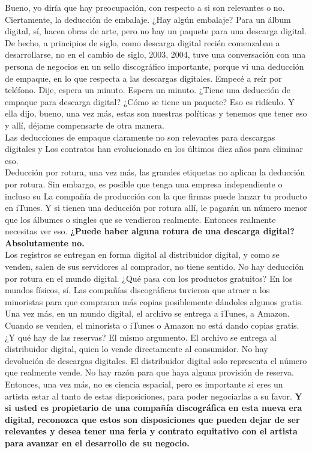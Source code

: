 \documentclass[10pt]{book}
\begin{document}
Bueno, yo diría que hay preocupación, con respecto a si son relevantes o no. Ciertamente, la deducción de embalaje. ¿Hay algún embalaje? Para un álbum digital, sí, hacen obras de arte, pero no hay un paquete para una descarga digital. De hecho, a principios de siglo, como descarga digital recién comenzaban a desarrollarse, no en el cambio de siglo, 2003, 2004, tuve una conversación con una persona de negocios en un sello discográfico importante, porque vi una deducción de empaque, en lo que respecta a las descargas digitales. Empecé a reír por teléfono. Dije, espera un minuto. Espera un minuto. ¿Tiene una deducción de empaque para descarga digital? ¿Cómo se tiene un paquete? Eso es ridículo. Y ella dijo, bueno, una vez más, estas son nuestras políticas y tenemos que tener eso y allí, déjame compensarte de otra manera.\\
Las deducciones de empaque claramente no son relevantes para descargas digitales y Los contratos han evolucionado en los últimos diez años para eliminar eso.\\
Deducción por rotura, una vez más, las grandes etiquetas no aplican la deducción por rotura. Sin embargo, es posible que tenga una empresa independiente o incluso su La compañía de producción con la que firmas puede lanzar tu producto en iTunes. Y si tienen una deducción por rotura allí, le pagarán un número menor que los álbumes o singles que se vendieron realmente. Entonces realmente necesitas ver eso. \textbf{¿Puede haber alguna rotura de una descarga digital? Absolutamente no.}\\
Los registros se entregan en forma digital al distribuidor digital, y como se venden, salen de sus servidores al comprador, no tiene sentido. No hay deducción por rotura en el mundo digital. ¿Qué pasa con los productos gratuitos? En los mundos físicos, sí. Las compañías discográficas tuvieron que atraer a los minoristas para que compraran más copias posiblemente dándoles algunos gratis. Una vez más, en un mundo digital, el archivo se entrega a iTunes, a Amazon. Cuando se venden, el minorista o iTunes o Amazon no está dando copias gratis. ¿Y qué hay de las reservas? El mismo argumento. El archivo se entrega al distribuidor digital, quien lo vende directamente al consumidor. No hay devolución de descargas digitales. El distribuidor digital solo representa el número que realmente vende. No hay razón para que haya alguna provisión de reserva.\\
Entonces, una vez más, no es ciencia espacial, pero es importante si eres un artista estar al tanto de estas disposiciones, para poder negociarlas a su favor.\textbf{ Y si usted es propietario de una compañía discográfica en esta nueva era digital, reconozca que estos son disposiciones que pueden dejar de ser relevantes y desea tener una feria y contrato equitativo con el artista para avanzar en el desarrollo de su negocio.}
\end{document}
